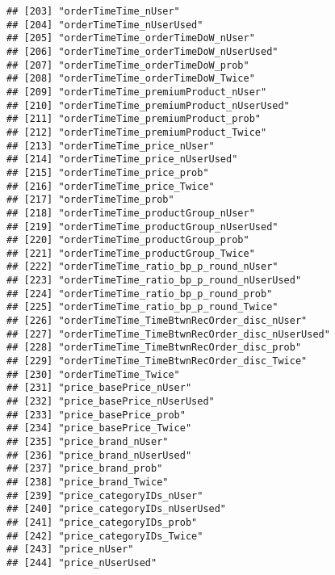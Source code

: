 \documentclass[10pt]{report}
\begin{document}
\begin{verbatim}
## [203] "orderTimeTime_nUser"                                
## [204] "orderTimeTime_nUserUsed"                            
## [205] "orderTimeTime_orderTimeDoW_nUser"                   
## [206] "orderTimeTime_orderTimeDoW_nUserUsed"               
## [207] "orderTimeTime_orderTimeDoW_prob"                    
## [208] "orderTimeTime_orderTimeDoW_Twice"                   
## [209] "orderTimeTime_premiumProduct_nUser"                 
## [210] "orderTimeTime_premiumProduct_nUserUsed"             
## [211] "orderTimeTime_premiumProduct_prob"                  
## [212] "orderTimeTime_premiumProduct_Twice"                 
## [213] "orderTimeTime_price_nUser"                          
## [214] "orderTimeTime_price_nUserUsed"                      
## [215] "orderTimeTime_price_prob"                           
## [216] "orderTimeTime_price_Twice"                          
## [217] "orderTimeTime_prob"                                 
## [218] "orderTimeTime_productGroup_nUser"                   
## [219] "orderTimeTime_productGroup_nUserUsed"               
## [220] "orderTimeTime_productGroup_prob"                    
## [221] "orderTimeTime_productGroup_Twice"                   
## [222] "orderTimeTime_ratio_bp_p_round_nUser"               
## [223] "orderTimeTime_ratio_bp_p_round_nUserUsed"           
## [224] "orderTimeTime_ratio_bp_p_round_prob"                
## [225] "orderTimeTime_ratio_bp_p_round_Twice"               
## [226] "orderTimeTime_TimeBtwnRecOrder_disc_nUser"          
## [227] "orderTimeTime_TimeBtwnRecOrder_disc_nUserUsed"      
## [228] "orderTimeTime_TimeBtwnRecOrder_disc_prob"           
## [229] "orderTimeTime_TimeBtwnRecOrder_disc_Twice"          
## [230] "orderTimeTime_Twice"                                
## [231] "price_basePrice_nUser"                              
## [232] "price_basePrice_nUserUsed"                          
## [233] "price_basePrice_prob"                               
## [234] "price_basePrice_Twice"                              
## [235] "price_brand_nUser"                                  
## [236] "price_brand_nUserUsed"                              
## [237] "price_brand_prob"                                   
## [238] "price_brand_Twice"                                  
## [239] "price_categoryIDs_nUser"                            
## [240] "price_categoryIDs_nUserUsed"                        
## [241] "price_categoryIDs_prob"                             
## [242] "price_categoryIDs_Twice"                            
## [243] "price_nUser"                                        
## [244] "price_nUserUsed"                                    

\end{verbatim}
\end{document}
